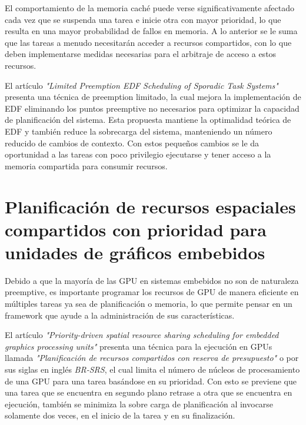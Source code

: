 El comportamiento de la memoria caché puede verse significativamente afectado cada vez que se suspenda una tarea e inicie otra con mayor prioridad, lo que resulta en una mayor probabilidad de fallos en memoria. A lo anterior se le suma que las tareas a menudo necesitarán acceder a recursos compartidos, con lo que deben implementarse medidas necesarias para el arbitraje de acceso a estos recursos.

\vspace{0.3cm}

El artículo \textit{"Limited Preemption EDF Scheduling of Sporadic Task Systems"} \cite{LimPree} presenta una técnica de preemption limitado, la cual mejora la implementación de EDF eliminando los puntos preemptive no necesarios para optimizar la capacidad de planificación del sistema. Esta propuesta mantiene la optimalidad teórica de EDF y también reduce la sobrecarga del sistema, manteniendo un número reducido de cambios de contexto. Con estos pequeños cambios se le da oportunidad a las tareas con poco privilegio ejecutarse y tener acceso a la memoria compartida para consumir recursos.

 \section{Planificación de recursos espaciales compartidos con prioridad para unidades de gráficos embebidos} 
	
Debido a que la mayoría de las GPU en sistemas embebidos no son de naturaleza preemptive, es importante programar los recursos de GPU de manera eficiente en múltiples tareas \cite{TX2I} ya sea de planificación o memoria, lo que permite pensar en un framework que ayude a la administración de sus características. 

\vspace{0.3cm}

El artículo \textit{"Priority-driven spatial resource sharing scheduling for embedded graphics processing units"}\cite{Pridriven} presenta una técnica para la ejecución en GPUs llamada \textit{"Planificación de recursos compartidos con reserva de presupuesto"} o por sus siglas en inglés \textit{BR-SRS}, el cual limita el número de núcleos de procesamiento de una GPU para una tarea basándose en su prioridad. Con esto se previene que una tarea que se encuentra en segundo plano retrase a otra que se encuentra en ejecución, también se minimiza la sobre carga de planificación al invocarse solamente dos veces, en el inicio de la tarea y en su finalización.

